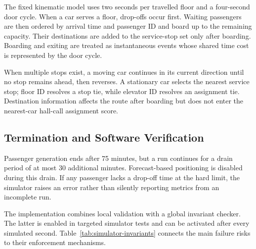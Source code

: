 \documentclass[12pt]{article}
\begin{document}
The fixed kinematic model uses two seconds per travelled floor and a four-second
door cycle. When a car serves a floor, drop-offs occur first. Waiting passengers
are then ordered by arrival time and passenger ID and board up to the remaining
capacity. Their destinations are added to the service-stop set only after
boarding. Boarding and exiting are treated as instantaneous events whose shared
time cost is represented by the door cycle.

When multiple stops exist, a moving car continues in its current direction
until no stop remains ahead, then reverses. A stationary car selects the
nearest service stop; floor ID resolves a stop tie, while elevator ID resolves
an assignment tie. Destination information affects the route after boarding
but does not enter the nearest-car hall-call assignment score.

\subsection{Termination and Software Verification}

Passenger generation ends after 75 minutes, but a run continues for a drain
period of at most 30 additional minutes. Forecast-based positioning is disabled
during this drain. If any passenger lacks a drop-off time at the hard limit,
the simulator raises an error rather than silently reporting metrics from an
incomplete run.

The implementation combines local validation with a global invariant checker.
The latter is enabled in targeted simulator tests and can be activated after
every simulated second. Table~\ref{tab:simulator-invariants} connects the main
failure risks to their enforcement mechanisms.
\end{document}
